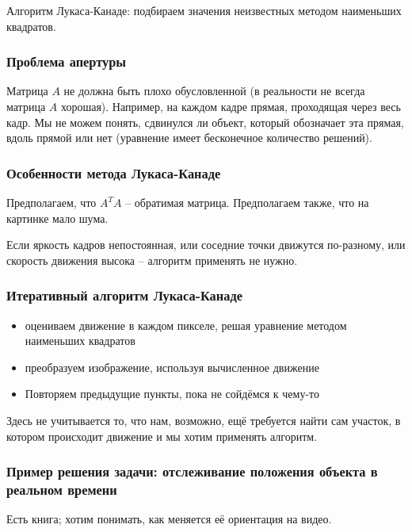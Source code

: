 \documentclass[main.tex]{subfiles}
\begin{document}
Алгоритм Лукаса-Канаде: подбираем значения неизвестных методом наименьших квадратов.

\subsubsection{Проблема апертуры}

Матрица $ A $ не должна быть плохо обусловленной (в реальности не всегда матрица $ A $ хорошая).
Например, на каждом кадре прямая, проходящая через весь кадр.
Мы не можем понять, сдвинулся ли объект, который обозначает эта прямая, вдоль прямой или нет (уравнение имеет бесконечное количество решений).

\subsubsection{Особенности метода Лукаса-Канаде}

Предполагаем, что $ A^TA $ -- обратимая матрица.
Предполагаем также, что на картинке мало шума.

Если яркость кадров непостоянная, или соседние точки движутся по-разному, или скорость движения высока -- алгоритм применять не нужно.

\subsubsection{Итеративный алгоритм Лукаса-Канаде}

\begin{itemize}[noitemsep]
	\item оцениваем движение в каждом пикселе, решая уравнение методом наименьших квадратов
	\item преобразуем изображение, используя вычисленное движение %
	\item Повторяем предыдущие пункты, пока не сойдёмся к чему-то
\end{itemize}

Здесь не учитывается то, что нам, возможно, ещё требуется найти сам участок, в котором происходит движение и мы хотим применять алгоритм.

\subsubsection{Пример решения задачи: отслеживание положения объекта в реальном времени}

Есть книга; хотим понимать, как меняется её ориентация на видео.
\end{document}
